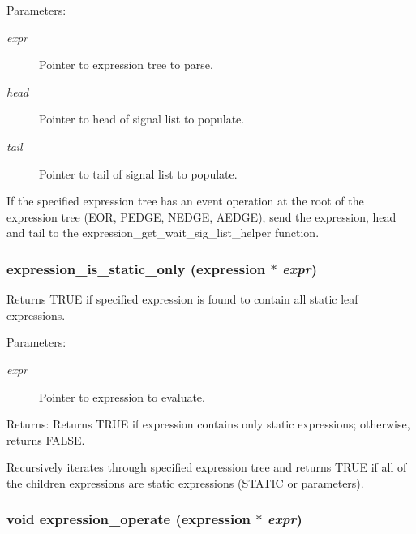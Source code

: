 \begin{Desc}
\item[Parameters:]
\begin{description}
\item[{\em expr}]Pointer to expression tree to parse. \item[{\em head}]Pointer to head of signal list to populate. \item[{\em tail}]Pointer to tail of signal list to populate.\end{description}
\end{Desc}
If the specified expression tree has an event operation at the root of the expression tree (EOR, PEDGE, NEDGE, AEDGE), send the expression, head and tail to the expression\_\-get\_\-wait\_\-sig\_\-list\_\-helper function. 
\subsubsection{ expression\_\-is\_\-static\_\-only ({\bf expression} $\ast$ {\em expr})}\label{expr_8h_a13}


Returns TRUE if specified expression is found to contain all static leaf expressions. 

\begin{Desc}
\item[Parameters:]
\begin{description}
\item[{\em expr}]Pointer to expression to evaluate.\end{description}
\end{Desc}
\begin{Desc}
\item[Returns:]Returns TRUE if expression contains only static expressions; otherwise, returns FALSE.\end{Desc}
Recursively iterates through specified expression tree and returns TRUE if all of the children expressions are static expressions (STATIC or parameters). 
\subsubsection{\setlength{\rightskip}{0pt plus 5cm}void expression\_\-operate ({\bf expression} $\ast$ {\em expr})}\label{expr_8h_a10}


